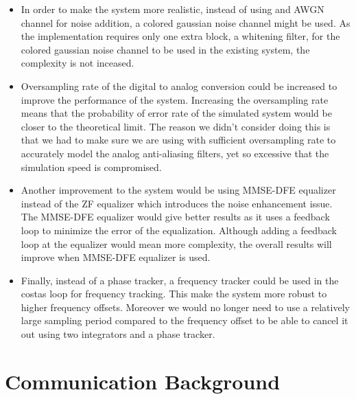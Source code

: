 \documentclass[]{article}
\begin{document}
\begin{itemize}
\item In order to make the system more realistic, instead of using and AWGN channel for noise addition, a colored gaussian noise channel might be used. As the implementation requires only one extra block, a whitening filter, for the colored gaussian noise channel to be used in the existing system, the complexity is not inceased. 
\item Oversampling rate of the digital to analog conversion could be increased to improve the performance of the system. Increasing the oversampling rate means that the probability of error rate of the simulated system would be closer to the theoretical limit. The reason we didn't consider doing this is that we had to make sure we are using with sufficient oversampling rate to accurately model the analog anti-aliasing filters, yet so excessive that the simulation speed is compromised.
\item Another improvement to the system would be using MMSE-DFE equalizer instead of the ZF equalizer which introduces the noise enhancement issue. The MMSE-DFE equalizer would give better results as it uses a feedback loop to minimize the error of the equalization. Although adding a feedback loop at the equalizer would mean more complexity, the overall results will improve when MMSE-DFE equalizer is used.
\item Finally, instead of a phase tracker, a frequency tracker could be used in the costas loop for frequency tracking. This make the system more robust to higher frequency offsets. Moreover we would no longer need to use a relatively large sampling period compared to the frequency offset to be able to cancel it out using two integrators and a phase tracker. 
\end{itemize}


\appendix
\newpage


\newpage
%

\section{Communication Background}
\end{document}
